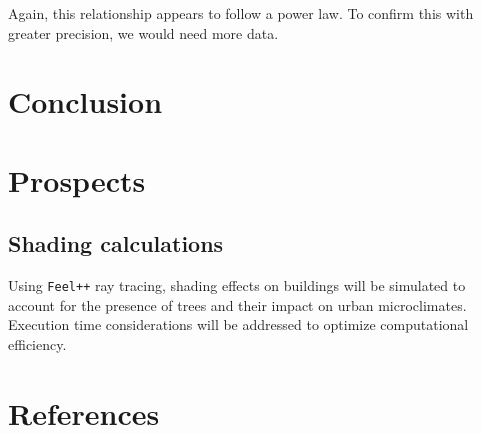 \documentclass[12pt]{article}
\begin{document}
Again, this relationship appears to follow a power law. To confirm this with
greater precision, we would need more data.

\newpage

\section{Conclusion}

\section{Prospects}

\subsection{Shading calculations}
Using \texttt{Feel++} ray tracing, shading effects on buildings will be simulated to account for the presence
of trees and their impact on urban microclimates. Execution time considerations will be
addressed to optimize computational efficiency.


\newpage

\section{References}


\end{document}
